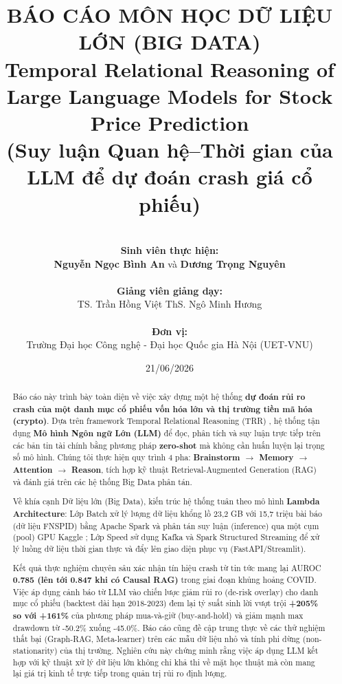 \documentclass[11pt, a4paper]{article}
\title{\textbf{BÁO CÁO MÔN HỌC DỮ LIỆU LỚN (BIG DATA)}\\ \vspace{1cm} \huge \textbf{Temporal Relational Reasoning of Large Language Models for Stock Price Prediction}\\ \vspace{0.5cm} \large (Suy luận Quan hệ–Thời gian của LLM để dự đoán crash giá cổ phiếu)}
\author{\vspace{1cm}\\
\textbf{Sinh viên thực hiện:}\\
\textbf{Nguyễn Ngọc Bình An} \quad và \quad \textbf{Dương Trọng Nguyên}\\\vspace{0.5cm}\\
\textbf{Giảng viên giảng dạy:}\\ TS. Trần Hồng Việt \quad ThS. Ngô Minh Hương\\\vspace{0.5cm}\\
\textbf{Đơn vị:}\\ Trường Đại học Công nghệ - Đại học Quốc gia Hà Nội (UET-VNU)}
\date{\vspace{1cm}21/06/2026}
\begin{document}
\begin{titlepage}
\maketitle
\thispagestyle{empty}
\end{titlepage}

\newpage
{}
\begin{abstract}
Báo cáo này trình bày toàn diện về việc xây dựng một hệ thống \textbf{dự đoán rủi ro crash của một danh mục cổ phiếu vốn hóa lớn và thị trường tiền mã hóa (crypto)}. Dựa trên framework Temporal Relational Reasoning (TRR) \cite{trr_paper}, hệ thống tận dụng \textbf{Mô hình Ngôn ngữ Lớn (LLM)} để đọc, phân tích và suy luận trực tiếp trên các bản tin tài chính bằng phương pháp \textbf{zero-shot} mà không cần huấn luyện lại trọng số mô hình. Chúng tôi thực hiện quy trình 4 pha: \textbf{Brainstorm $\rightarrow$ Memory $\rightarrow$ Attention $\rightarrow$ Reason}, tích hợp kỹ thuật Retrieval-Augmented Generation (RAG) \cite{rag} và đánh giá trên các hệ thống Big Data phân tán.

Về khía cạnh Dữ liệu lớn (Big Data), kiến trúc hệ thống tuân theo mô hình \textbf{Lambda Architecture}: Lớp Batch xử lý lượng dữ liệu khổng lồ 23,2 GB với 15,7 triệu bài báo (dữ liệu FNSPID) bằng Apache Spark \cite{spark} và phân tán suy luận (inference) qua một cụm (pool) GPU Kaggle \cite{kaggle}; Lớp Speed sử dụng Kafka \cite{kafka} và Spark Structured Streaming để xử lý luồng dữ liệu thời gian thực và đẩy lên giao diện phục vụ (FastAPI/Streamlit). 

Kết quả thực nghiệm chuyên sâu xác nhận tín hiệu crash từ tin tức mang lại AUROC \textbf{0.785 (lên tới 0.847 khi có Causal RAG)} trong giai đoạn khủng hoảng COVID. Việc áp dụng cảnh báo từ LLM vào chiến lược giảm rủi ro (de-risk overlay) cho danh mục cổ phiếu (backtest dài hạn 2018-2023) đem lại tỷ suất sinh lời vượt trội \textbf{+205\% so với +161\%} của phương pháp mua-và-giữ (buy-and-hold) và giảm mạnh max drawdown từ -50.2\% xuống -45.0\%. Báo cáo cũng đề cập trung thực về các thử nghiệm thất bại (Graph-RAG, Meta-learner) trên các mẫu dữ liệu nhỏ và tính phi dừng (non-stationarity) của thị trường. Nghiên cứu này chứng minh rằng việc áp dụng LLM kết hợp với kỹ thuật xử lý dữ liệu lớn không chỉ khả thi về mặt học thuật mà còn mang lại giá trị kinh tế trực tiếp trong quản trị rủi ro định lượng.
\end{abstract}

\newpage
\tableofcontents
\newpage
\end{document}
